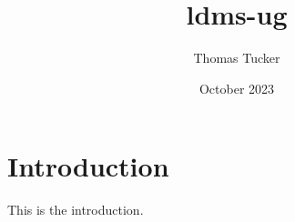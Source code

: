 \documentclass{article}
\title{ldms-ug}
\author{Thomas Tucker}
\date{October 2023}
\begin{document}
\maketitle

\section{Introduction}
This is the introduction.
\end{document}
